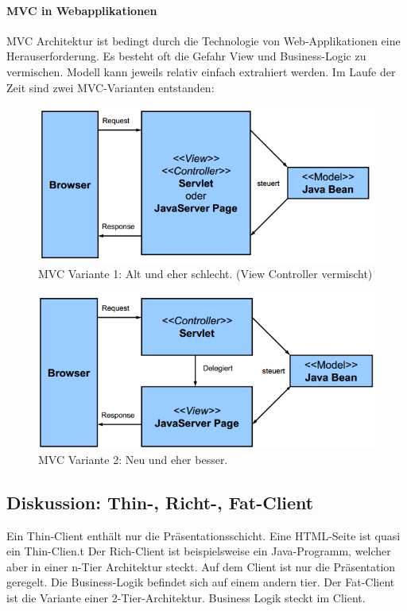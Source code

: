 \paragraph{MVC in Webapplikationen} MVC Architektur ist bedingt durch die Technologie von Web-Applikationen eine Herauserforderung. Es besteht oft die Gefahr View und Business-Logic zu vermischen. Modell kann jeweils relativ einfach extrahiert werden. Im Laufe der Zeit sind zwei MVC-Varianten entstanden:

\begin{figure}[h!]
\centering
\includegraphics[width=0.7\linewidth]{fig/mvc-web-1}
\caption{MVC Variante 1: Alt und eher schlecht. (View Controller vermischt)}
\label{fig:mvc-web-1}
\end{figure}

\begin{figure}[h!]
\centering
\includegraphics[width=0.7\linewidth]{fig/mvc-web-2}
\caption{MVC Variante 2: Neu und eher besser.}
\label{fig:mvc-web-2}
\end{figure}



\subsection{Diskussion: Thin-, Richt-, Fat-Client}
Ein Thin-Client enthält nur die Präsentationsschicht. Eine HTML-Seite ist quasi ein Thin-Clien.t
Der Rich-Client ist beispielsweise ein Java-Programm, welcher aber in einer n-Tier Architektur steckt. Auf dem Client ist nur die Präsentation geregelt. Die Business-Logik befindet sich auf einem andern tier. Der Fat-Client ist die Variante einer 2-Tier-Architektur. Business Logik steckt im Client.
